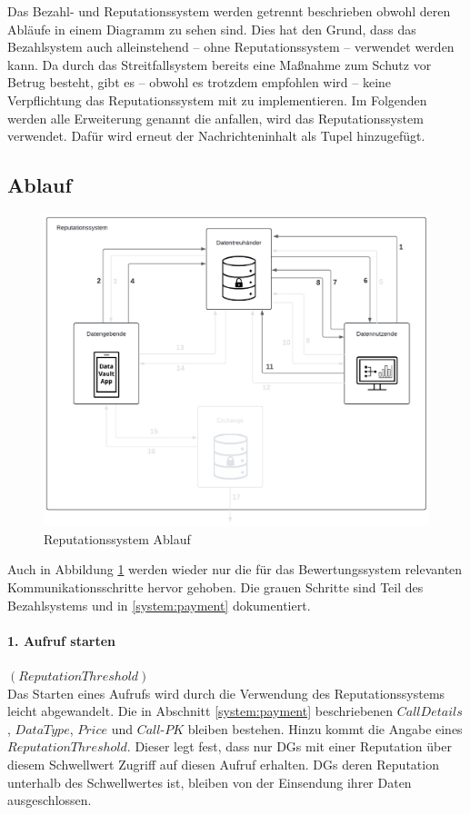 \documentclass[
	fontsize=11pt,
	headings=small,
	parskip=half,           %
	bibliography=totoc,
	numbers=noenddot,       %
	open=any,               %
]{scrreprt}
\begin{document}
Das Bezahl- und Reputationssystem werden getrennt beschrieben obwohl deren Abläufe in einem Diagramm zu sehen sind. Dies hat den Grund, dass das Bezahlsystem auch alleinstehend -- ohne Reputationssystem -- verwendet werden kann. Da durch das Streitfallsystem bereits eine Maßnahme zum Schutz vor Betrug besteht, gibt es -- obwohl es trotzdem empfohlen wird -- keine Verpflichtung das Reputationssystem mit zu implementieren. Im Folgenden werden alle Erweiterung genannt die anfallen, wird das Reputationssystem verwendet. Dafür wird erneut der Nachrichteninhalt als Tupel hinzugefügt.
\subsection{Ablauf}
\begin{figure}[h]
    \centering
    \includegraphics[width=0.9\linewidth]{ReputationDiagramm.pdf}
    \caption{Reputationssystem Ablauf}
    \label{fig:reputation}
\end{figure}

Auch in Abbildung \ref{fig:reputation} werden wieder nur die für das Bewertungssystem relevanten Kommunikationsschritte hervor gehoben. Die grauen Schritte sind Teil des Bezahlsystems und in \ref{system:payment} dokumentiert. 

\paragraph{1. Aufruf starten} $(ReputationThreshold)$\\
Das Starten eines Aufrufs wird durch die Verwendung des Reputationssystems leicht abgewandelt. Die in Abschnitt \ref{system:payment} beschriebenen $CallDetails$, $DataType$, $Price$ und $Call$-$PK$ bleiben bestehen. Hinzu kommt die Angabe eines $ReputationThreshold$. Dieser legt fest, dass nur DGs mit einer Reputation über diesem Schwellwert Zugriff auf diesen Aufruf erhalten. DGs deren Reputation unterhalb des Schwellwertes ist, bleiben von der Einsendung ihrer Daten ausgeschlossen.
\end{document}
